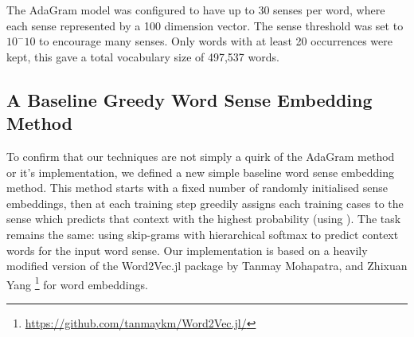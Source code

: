 \documentclass{sig-alternate}
\begin{document}

The AdaGram model was configured to have up to 30 senses per word, where each sense represented by a 100 dimension vector. The sense threshold was set to $10^-10$ to encourage many senses.
Only words with at least 20 occurrences were kept, this gave a total vocabulary size of 497,537 words.





\subsection{A Baseline Greedy Word Sense Embedding Method}

To confirm that our techniques are not simply a quirk of the AdaGram method or it's implementation, we defined a new simple baseline word sense embedding method.
This method starts with a fixed number of randomly initialised sense embeddings, then at each training step greedily assigns each training cases to the sense which predicts that context with the highest probability (using ). The task remains the same: using skip-grams with hierarchical softmax to predict context words for the input word sense.
Our implementation is based on a heavily modified version of the Word2Vec.jl package by Tanmay Mohapatra, and Zhixuan Yang \footnote{\url{https://github.com/tanmaykm/Word2Vec.jl/}} for word embeddings.
\end{document}

